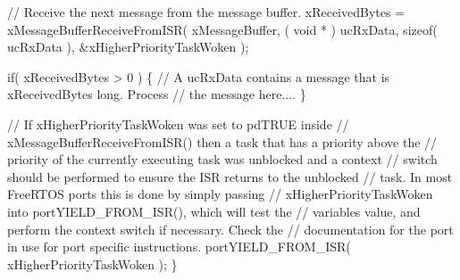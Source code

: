 \begin{DoxyPre}    // Receive the next message from the message buffer.
    xReceivedBytes = xMessageBufferReceiveFromISR( xMessageBuffer,
                                                  ( void * ) ucRxData,
                                                  sizeof( ucRxData ),
                                                  \&xHigherPriorityTaskWoken );\end{DoxyPre}



\begin{DoxyPre}    if( xReceivedBytes > 0 )
    \{
        // A ucRxData contains a message that is xReceivedBytes long.  Process
        // the message here....
    \}\end{DoxyPre}



\begin{DoxyPre}    // If xHigherPriorityTaskWoken was set to pdTRUE inside
    // xMessageBufferReceiveFromISR() then a task that has a priority above the
    // priority of the currently executing task was unblocked and a context
    // switch should be performed to ensure the ISR returns to the unblocked
    // task.  In most FreeRTOS ports this is done by simply passing
    // xHigherPriorityTaskWoken into portYIELD\_FROM\_ISR(), which will test the
    // variables value, and perform the context switch if necessary.  Check the
    // documentation for the port in use for port specific instructions.
    portYIELD\_FROM\_ISR( xHigherPriorityTaskWoken );
\}
\end{DoxyPre}
 
